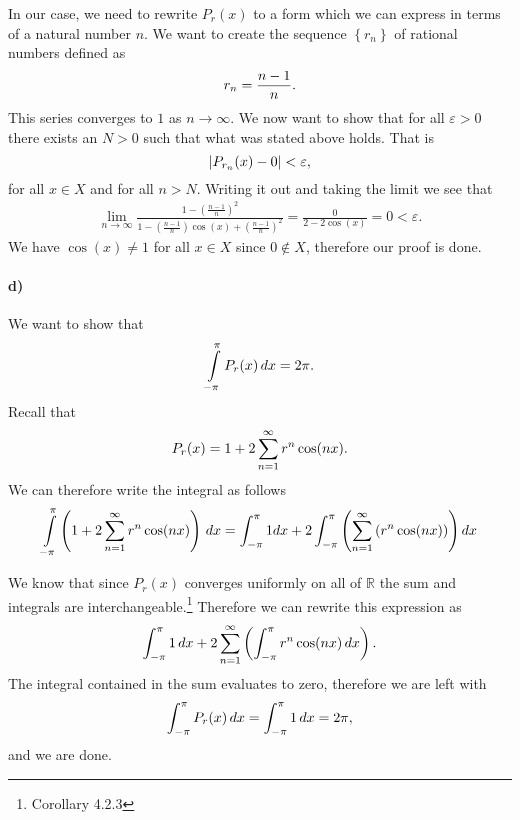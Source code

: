 \documentclass[a4paper]{article}
\begin{document}
In our case, we need to rewrite $P_r(x)$ to a form which we can express in terms of a natural number $n$.
We want to create the sequence $\left\{ r_n \right\}$ of rational numbers defined as
\begin{equation}
  \notag
  r_n = \frac{n - 1}{n}.
\end{equation}
This series converges to $1$ as $n \rightarrow \infty$. We now want to show that for all $\varepsilon>0$ there exists an $N > 0$ such that what was stated above holds. That is
\begin{equation}
  \notag
  |P_{r_n}(x) - 0| < \varepsilon, 
\end{equation}
for all $x \in X$ and for all $n > N$.
Writing it out and taking the limit we see that
\begin{align*}
  \lim\limits_{n\rightarrow\infty}\frac{1 - \left(\frac{n - 1}{n}\right)^2}{1 - \left( \frac{n-1}{n} \right)\cos(x) + \left( \frac{n-1}{n} \right)^{2}} = \frac{0}{2 - 2\cos(x)} = 0 < \varepsilon.
\end{align*}
We have $\cos(x) \neq 1$ for all $x \in X$ since $0 \notin X$, therefore our proof is done.

\paragraph{d)}
We want to show that
\begin{equation}
  \notag
  \int\limits_{-\pi}^{\pi}P_r(x)\, dx = 2\pi.
\end{equation}
Recall that
\begin{equation}
  \notag
  P_r(x) = 1 + 2\sum_{n=1}^{\infty}r^n\cos(nx).
\end{equation}
We can therefore write the integral as follows
\begin{equation}
  \notag
  \int\limits_{-\pi}^{\pi} \left(1 + 2\sum_{n=1}^{\infty}r^n\cos(nx)\right) \, dx = \int_{-\pi}^{\pi} 1 dx + 2\int_{-\pi}^{\pi}\left(\sum_{n=1}^{\infty}\left(r^n\cos(nx)\right)\right)dx
\end{equation}

We know that since $P_r(x)$ converges uniformly on all of $\mathbb{R}$ the sum and integrals are interchangeable.\footnote{Corollary 4.2.3}
Therefore we can rewrite this expression as
\begin{equation}
  \notag
  \int_{-\pi}^{\pi} 1 \, dx + 2\sum_{n=1}^{\infty}\left( \int_{-\pi}^{\pi}r^n\cos(nx) \, dx \right).
\end{equation}
The integral contained in the sum evaluates to zero, therefore we are left with
\begin{equation}
  \notag
  \int_{-\pi}^{\pi}P_r(x) \, dx = \int_{-\pi}^{\pi}1 \, dx = 2\pi, 
\end{equation}
and we are done.
\end{document}
